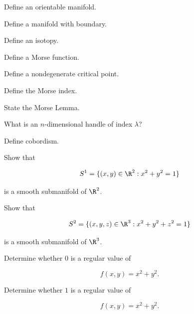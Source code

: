 \begin{exercise}[1]
Define an orientable manifold.
\end{exercise}

\begin{exercise}[1]
Define a manifold with boundary.
\end{exercise}

\begin{exercise}[1]
Define an isotopy.
\end{exercise}

\begin{exercise}[1]
Define a Morse function.
\end{exercise}

\begin{exercise}[1]
Define a nondegenerate critical point.
\end{exercise}

\begin{exercise}[1]
Define the Morse index.
\end{exercise}

\begin{exercise}[1]
State the Morse Lemma.
\end{exercise}

\begin{exercise}[1]
What is an \(n\)-dimensional handle of index \(\lambda\)?
\end{exercise}

\begin{exercise}[1]
Define cobordism.
\end{exercise}

\begin{exercise}[2]
Show that

\[
S^1
=
\{(x,y)\in\R^2:x^2+y^2=1\}
\]

is a smooth submanifold of \(\R^2\).
\end{exercise}

\begin{exercise}[2]
Show that

\[
S^2
=
\{(x,y,z)\in\R^3:x^2+y^2+z^2=1\}
\]

is a smooth submanifold of \(\R^3\).
\end{exercise}

\begin{exercise}[2]
Determine whether \(0\) is a regular value of

\[
f(x,y)=x^2+y^2.
\]
\end{exercise}

\begin{exercise}[2]
Determine whether \(1\) is a regular value of

\[
f(x,y)=x^2+y^2.
\]
\end{exercise}

